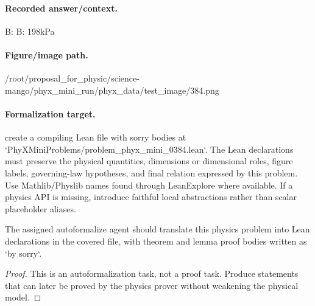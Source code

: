 \paragraph{Recorded answer/context.}
B: B: 198kPa

\paragraph{Figure/image path.}
/root/proposal\_for\_physic/science-mango/phyx\_mini\_run/phyx\_data/test\_image/384.png

\paragraph{Formalization target.}
create a compiling Lean file with sorry bodies at `PhyXMiniProblems/problem\_phyx\_mini\_0384.lean`. The Lean declarations must preserve the physical quantities, dimensions or dimensional roles, figure labels, governing-law hypotheses, and final relation expressed by this problem.
Use Mathlib/Physlib names found through LeanExplore where available. If a physics API is missing, introduce faithful local abstractions rather than scalar placeholder aliases.

\begin{theorem}
\label{thm:physics:phyx_mini_0384:target}
The assigned autoformalize agent should translate this physics problem into Lean declarations in the covered file, with theorem and lemma proof bodies written as `by sorry`.
\end{theorem}
\begin{proof}
This is an autoformalization task, not a proof task. Produce statements that can later be proved by the physics prover without weakening the physical model.
\end{proof}

